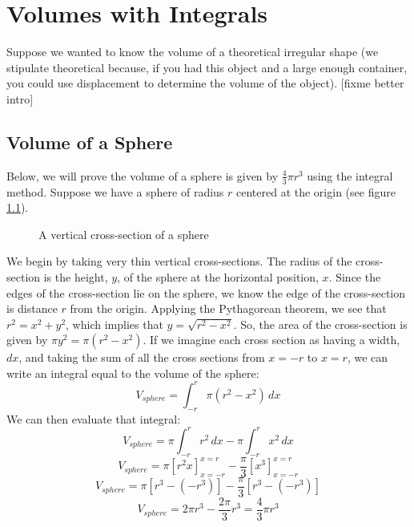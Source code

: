 \chapter{Volumes with Integrals}
Suppose we wanted to know the volume of a theoretical irregular shape (we 
stipulate theoretical because, if you had this object and a large enough 
container, you could use displacement to determine the volume of the object). 
[fixme better intro]

\section{Volume of a Sphere}
Below, we will prove the volume of a sphere is given by $\frac{4}{3}\pi r^3$ 
using the integral method. Suppose we have a sphere of radius $r$ centered at 
the origin (see figure \ref{fig:sphere}).

\begin{figure}[htbp]
\centering
    \caption{A vertical cross-section of a sphere}
    \label{fig:sphere}
\end{figure}

We begin by taking very thin vertical cross-sections. The radius of the 
cross-section is the height, $y$, of the sphere at the horizontal position, 
$x$. Since the edges of the cross-section lie on the sphere, we know the edge 
of the cross-section is distance $r$ from the origin. Applying the Pythagorean 
theorem, we see that $r^2 = x^2 + y^2$, which implies that $y = \sqrt{r^2 - x^2
}$. So, the area of the cross-section is given by $\pi y^2 = \pi (r^2 - x^
2)$. If we imagine each cross section as having a width, $dx$, and taking the 
sum of all the cross sections from $x = -r$ to $x = r$, we can write an 
integral equal to the volume of the sphere:
$$V_{sphere} = \int_{-r}^{r} \pi (r^2 - x^2)\,dx$$
We can then evaluate that integral:
$$V_{sphere} = \pi \int_{-r}^{r} r^2\,dx - \pi \int_{-r}^{r} x^2\,dx$$
$$V_{sphere} = \pi \left[ r^2 x \right] _{x = -r}^{x = r} - \frac{\pi}{3} \left[
x^3 \right] _{x = -r}^{x = r} $$
$$V_{sphere} = \pi \left[ r^3 - (-r^3) \right] - \frac{\pi}{3} \left[r^3 - (-r^
3) \right]$$
$$V_{sphere} = 2 \pi r^3 - \frac{2\pi}{3} r^3 = \frac{4}{3}\pi r^3$$

